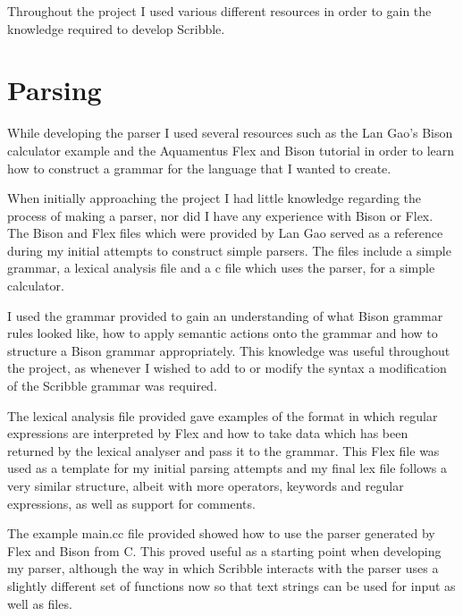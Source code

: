 \documentclass[]{final_report}
\begin{document}
Throughout the project I used various different resources in order to gain the knowledge required to develop Scribble.

\section{Parsing}

While developing the parser I used several resources such as the Lan Gao's Bison calculator\cite{BISONTUT} example and the Aquamentus Flex and Bison tutorial\cite{AQBISON} in order to learn how to construct a grammar for the language that I wanted to create.

When initially approaching the project I had little knowledge regarding the process of making a parser, nor did I have any experience with Bison or Flex. The Bison and Flex files which were provided by Lan Gao served as a reference during my initial attempts to construct simple parsers. The files include a simple grammar, a lexical analysis file and a c file which uses the parser, for a simple calculator.

I used the grammar provided to gain an understanding of what Bison grammar rules looked like, how to apply semantic actions onto the grammar and how to structure a Bison grammar appropriately. This knowledge was useful throughout the project, as whenever I wished to add to or modify the syntax a modification of the Scribble grammar was required.

The lexical analysis file provided gave examples of the format in which regular expressions are interpreted by Flex and how to take data which has been returned by the lexical analyser and pass it to the grammar. This Flex file was used as a template for my initial parsing attempts and my final lex file follows a very similar structure, albeit with more operators, keywords and regular expressions, as well as support for comments.

The example main.cc file provided showed how to use the parser generated by Flex and Bison from C. This proved useful as a starting point when developing my parser, although the way in which Scribble interacts with the parser uses a slightly different set of functions now so that text strings can be used for input as well as files.
\end{document}
